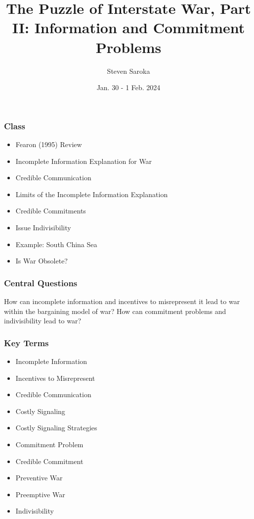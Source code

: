 \documentclass[handout]{beamer}
\title[The Puzzle of War (II)]{\LARGE{The Puzzle of Interstate War, Part II: Information and Commitment Problems}}
\author[POLI 150]{Steven Saroka}
\institute{POLI 150}
\date{Jan. 30 - 1 Feb. 2024}
\begin{document}
\begin{frame}
\titlepage %
\end{frame}

\begin{frame} 
	\frametitle{\LARGE{Class}}
	\begin{itemize}
		
			\item Fearon (1995) Review

			\item Incomplete Information Explanation for War

			\item Credible Communication

			\item Limits of the Incomplete Information Explanation
			\item Credible Commitments

			\item Issue Indivisibility

			\item Example: South China Sea

			\item Is War Obsolete?
		
	\end{itemize}
\end{frame}

\begin{frame} 
	\frametitle{\LARGE{Central Questions}}
	\begin{center}
		\LARGE How can incomplete information and incentives to misrepresent it lead to war within the bargaining model of war? How can commitment problems and indivisibility lead to war? 
	\end{center}
\end{frame}

\begin{frame} 
	\frametitle{\LARGE{Key Terms}}
	\begin{itemize}
		\item Incomplete Information 
		\item Incentives to Misrepresent
		\item Credible Communication
		\item Costly Signaling
		\item Costly Signaling Strategies
		\item Commitment Problem 
		\item Credible Commitment
		\item Preventive War
		\item Preemptive War
		\item Indivisibility
	\end{itemize}
\end{frame}
\end{document}
